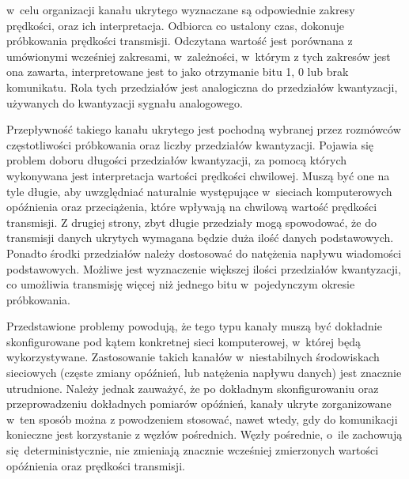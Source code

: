 \documentclass[a4paper, twoside, 12pt]{report}
\begin{document}
        w~celu organizacji kanału ukrytego wyznaczane są odpowiednie zakresy prędkości, oraz ich
        interpretacja. Odbiorca co ustalony czas, dokonuje próbkowania prędkości
        transmisji. Odczytana wartość jest porównana z umówionymi wcześniej zakresami,
        w~zależności, w~którym z tych zakresów jest ona zawarta, interpretowane jest to
        jako otrzymanie bitu 1, 0 lub brak komunikatu. Rola tych przedziałów jest analogiczna
        do przedziałów kwantyzacji, używanych do kwantyzacji sygnału analogowego.

        Przepływność takiego kanału ukrytego jest pochodną wybranej przez rozmówców
        częstotliwości próbkowania oraz liczby przedziałów kwantyzacji. Pojawia się
        problem doboru długości przedziałów kwantyzacji, za pomocą których wykonywana
        jest interpretacja wartości
        prędkości chwilowej. Muszą być one na tyle długie, aby uwzględniać naturalnie
        występujące w~sieciach komputerowych opóźnienia oraz przeciążenia, które wpływają
        na chwilową wartość prędkości transmisji. Z drugiej strony, zbyt długie przedziały
        mogą spowodować, że do transmisji danych ukrytych wymagana będzie duża ilość danych
        podstawowych. Ponadto środki przedziałów należy dostosować do natężenia
        napływu wiadomości podstawowych. Możliwe jest wyznaczenie większej ilości
        przedziałów kwantyzacji, co umożliwia transmisję więcej niż jednego bitu w~pojedynczym
        okresie próbkowania.

        Przedstawione problemy powodują, że tego typu kanały muszą być dokładnie
        skonfigurowane pod kątem konkretnej sieci komputerowej, w~której będą wykorzystywane.
        Zastosowanie takich kanałów w~niestabilnych środowiskach sieciowych (częste zmiany
        opóźnień, lub natężenia napływu danych) jest znacznie utrudnione. Należy jednak
        zauważyć, że po dokładnym skonfigurowaniu oraz przeprowadzeniu dokładnych
        pomiarów opóźnień, kanały ukryte zorganizowane w~ten sposób można z powodzeniem
        stosować, nawet wtedy, gdy do komunikacji konieczne jest korzystanie z węzłów pośrednich.
        Węzły pośrednie, o~ile zachowują się deterministycznie, nie zmieniają znacznie wcześniej
        zmierzonych wartości opóźnienia oraz prędkości transmisji.
\end{document}
